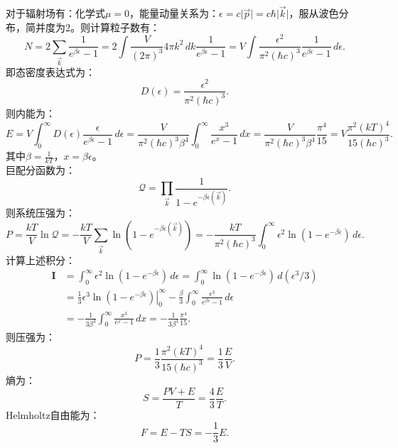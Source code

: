 \documentclass[reqno,a4paper,12pt]{amsart}
\begin{document}
\begin{tcolorbox}[breakable, colback = black!5!white, colframe = black]
对于辐射场有：化学式$\mu = 0$，能量动量关系为：$\epsilon = c\vert \vec{p} \vert = c\hbar \vert \vec{k} \vert$，服从波色分布，简并度为2。则计算粒子数有：
\[
	N = 2\sum_{\vec{k}} \frac{1}{e^{\beta\epsilon}-1} = 2\int \frac{V}{(2\pi)^3} 4\pi k^2\,dk \frac{1}{e^{\beta\epsilon}-1} = V \int \frac{\epsilon^2}{\pi^2(\hbar c)^3} \frac{1}{e^{\beta\epsilon}-1} \,d\epsilon.
\]
即态密度表达式为： 
\[
	D(\epsilon) = \frac{\epsilon^2}{\pi^2(\hbar c)^3}.
\]
则内能为：
\[
	E = V\int_0^{\infty} D(\epsilon)\frac{\epsilon}{e^{\beta\epsilon}-1}\,d\epsilon = \frac{V}{\pi^2(\hbar c)^3 \beta^4} \int_0^{\infty} \frac{x^3}{e^x-1}\,dx = \frac{V}{\pi^2(\hbar c)^3 \beta^4} \frac{\pi^4}{15} = V\frac{\pi^2(kT)^4}{15(\hbar c)^3}.
\]
其中$\beta = \frac{1}{kT}$，$x = \beta \epsilon$。 \\
巨配分函数为：
\[
	\mathcal{Q} = \prod_{\vec{k}} \frac{1}{1-e^{-\beta\epsilon(\vec{k})}}.
\]
则系统压强为：
\[
	P = \frac{kT}{V}\ln\mathcal{Q} = -\frac{kT}{V}\sum_{\vec{k}} \ln(1-e^{-\beta\epsilon(\vec{k})}) = -\frac{kT}{\pi^2(\hbar c)^3}\int_0^{\infty}\epsilon^2\ln(1-e^{-\beta\epsilon})\,d\epsilon.
\]
计算上述积分：
\begin{align*}
	\mathbf{I} &= \int_0^{\infty} \epsilon^2 \ln(1-e^{-\beta\epsilon})\,d\epsilon = \int_0^{\infty} \ln(1-e^{-\beta\epsilon}) \,d(\epsilon^3/3) \\ 
	&= \left. \frac{1}{3}\epsilon^3 \ln(1-e^{-\beta\epsilon}) \right\vert_0^{\infty} - \frac{\beta}{3}\int_0^{\infty} \frac{\epsilon^3}{e^{\beta\epsilon}-1}\,d\epsilon \\
	&= -\frac{1}{3\beta^3}\int_0^{\infty} \frac{x^3}{e^x-1}\,dx = -\frac{1}{3\beta^3}\frac{\pi^4}{15}.
\end{align*}
则压强为：
\[
	P = \frac{1}{3}\frac{\pi^2(kT)^4}{15(\hbar c)^3} = \frac{1}{3}\frac{E}{V}.
\]
熵为：
\[
	S = \frac{PV+E}{T} = \frac{4}{3}\frac{E}{T}.
\]
Helmholtz自由能为：
\[
	F = E - TS = -\frac{1}{3}E.
\]
\end{tcolorbox}
\end{document}
